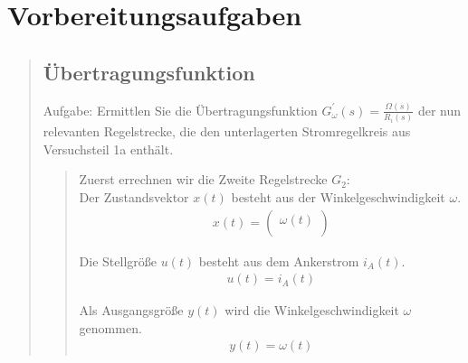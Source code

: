 \section{Vorbereitungsaufgaben}
\begin{quote}
	\subsection{Übertragungsfunktion}
    \hspace{-2em}
    Aufgabe:
    \hspace{-2em}Ermittlen Sie die Übertragungsfunktion $G_\omega^{'} (s) = \frac{\Omega(s)}{R_i (s)}$ der nun relevanten
    Regelstrecke, die den unterlagerten Stromregelkreis aus Versuchsteil 1a enthält.\\
	\begin{quote}
	   Zuerst errechnen wir die Zweite Regelstrecke $G_2$:\\
	   Der Zustandsvektor $x(t)$ besteht aus der Winkelgeschwindigkeit $\omega$.
        \begin{equation*}
            \begin{split}
                x(t) = 
                    \begin {pmatrix}
                        \omega(t)\\
                    \end{pmatrix}
            \end{split}
        \end{equation*}
        
        Die Stellgröße $u(t)$ besteht aus dem Ankerstrom $i_A(t)$.
        \begin{equation*}
            \begin{split}
                u(t) = i_A (t)
            \end{split}
        \end{equation*}
        
        Als Ausgangsgröße $y(t)$ wird die Winkelgeschwindigkeit $\omega$ genommen.
        \begin{equation*}
            \begin{split}
                y(t) = \omega(t)
            \end{split}
        \end{equation*}
        

\end{quote}
\end{quote}
